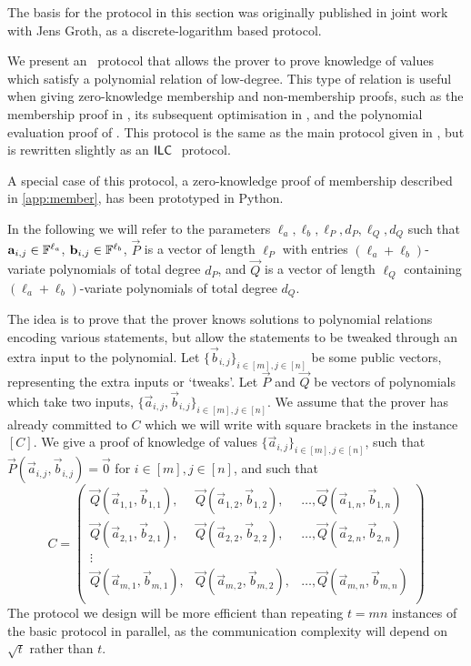 The basis for the protocol in this section was originally published in joint work \cite{BootleG18} with Jens Groth, as a discrete-logarithm based protocol.

We present an \ILC\ protocol that allows the prover to prove knowledge of values which satisfy a polynomial relation of low-degree. This type of relation is useful when giving zero-knowledge membership and non-membership proofs, such as the membership proof in \cite{GrothK15}, its subsequent optimisation in \cite{BootleCCGGP15}, and the polynomial evaluation proof of \cite{BayerG13}. This protocol is the same as the main protocol given in \cite{BootleG18}, but is rewritten slightly as an $\mathsf{ILC}~$ protocol.

A special case of this protocol, a zero-knowledge proof of membership described in \ref{app:member}, has been prototyped in Python.

In the following we will refer to the parameters $\ell_a,\ell_b,\ell_P,d_P,\ell_Q,d_Q$ such that $\mathbf{a}_{i,j}\in \mathbb{F}^{\ell_a}$, $\mathbf{b}_{i,j}\in \mathbb{F}^{\ell_b}$, $\vec{P}$ is a vector of length $\ell_P$ with entries $(\ell_a+\ell_b)$-variate polynomials of total degree $d_P$, and $\vec{Q}$ is a vector of length $\ell_Q$ containing $(\ell_a+\ell_b)$-variate polynomials of total degree $d_Q$.

The idea is to prove that the prover knows solutions to polynomial relations encoding various statements, but allow the statements to be tweaked through an extra input to the polynomial. Let $\lbrace \vec{b}_{i,j} \rbrace_{i\in[m],j\in[n]}$ be some public vectors, representing the extra inputs or `tweaks'. Let $\vec{P}$ and $\vec{Q}$ be vectors of polynomials which take two inputs, $\lbrace \vec{a}_{i,j}, \vec{b}_{i,j} \rbrace_{i\in[m],j\in[n]}$. We assume that the prover has already committed to $C$ which we will write with square brackets in the instance $[C]$. We give a proof of knowledge of values $\lbrace \vec{a}_{i,j} \rbrace_{i\in[m],j\in[n]}$, such that $\vec{P}(\vec{a}_{i,j},\vec{b}_{i,j})=\vec{0}$ for $i \in [m], j \in [n]$, and such that
$$C = \left(\begin{array}{lll}
\vec{Q}(\vec{a}_{1,1},\vec{b}_{1,1}),&\vec{Q}(\vec{a}_{1,2},\vec{b}_{1,2}),& \ldots,\vec{Q}(\vec{a}_{1,n},\vec{b}_{1,n}) \\
\vec{Q}(\vec{a}_{2,1},\vec{b}_{2,1}),&\vec{Q}(\vec{a}_{2,2},\vec{b}_{2,2}),& \ldots,\vec{Q}(\vec{a}_{2,n},\vec{b}_{2,n}) \\
\vdots \\
\vec{Q}(\vec{a}_{m,1},\vec{b}_{m,1}),&\vec{Q}(\vec{a}_{m,2},\vec{b}_{m,2}),& \ldots,\vec{Q}(\vec{a}_{m,n},\vec{b}_{m,n}) \\
\end{array}\right)$$
The protocol we design will be more efficient than repeating $t=mn$ instances of the basic protocol in parallel, as the communication complexity will depend on $\sqrt{t}$ rather than $t$.

